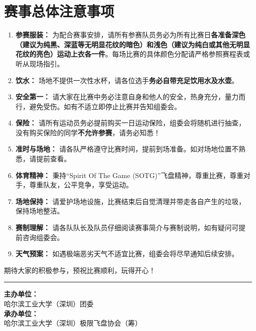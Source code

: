 \documentclass{ctexart}
\begin{document}
\section{赛事总体注意事项}
\begin{enumerate}[label=\arabic*., itemsep=0.5em]
    \item \textbf{参赛服装：} 为配合赛事安排，请所有参赛队员务必为所有比赛日\textbf{各准备深色（建议为纯黑、深蓝等无明显花纹的暗色）和浅色（建议为纯白或其他无明显花纹的亮色）运动上衣各一件}。每场比赛的具体颜色分配请严格参照赛程表或听从现场指引。
    \item \textbf{饮水：} 场地不提供一次性水杯，请各位选手\textbf{务必自带充足饮用水及水壶}。
    \item \textbf{安全第一：} 请大家在比赛中务必注意自身和他人的安全，热身充分，量力而行，避免受伤。如有不适立即停止比赛并告知组委会。
    \item \textbf{保险：} 请所有运动员务必提前购买一日运动保险，组委会将随机进行抽查，没有购买保险的同学\textbf{不允许参赛}，请务必知悉！
    \item \textbf{准时与场地：} 请各队严格遵守比赛时间，提前到场准备。如对场地位置不熟悉，请提前查看。
    \item \textbf{体育精神：} 秉持“Spirit Of The Game (SOTG)”飞盘精神，尊重比赛，尊重对手，尊重队友，公平竞争，享受运动。
    \item \textbf{场地保持：} 请爱护场地设施，比赛结束后自觉清理并带走各自产生的垃圾，保持场地整洁。
    \item \textbf{赛制理解：} 请各队队长及队员仔细阅读赛事简介与赛制说明，如有疑问可提前咨询组委会。
    \item \textbf{天气预案：} 如遇极端恶劣天气不适宜比赛，组委会将尽早通知后续安排。
\end{enumerate}
\vspace{1.5em}

\begin{center}
期待大家的积极参与，预祝比赛顺利，玩得开心！
\end{center}
\vspace{1.5em}

\noindent\rule{\linewidth}{0.4pt}
\vspace{1em}

\begin{flushleft}
\textbf{主办单位：} \\
哈尔滨工业大学（深圳）团委 \\[1em]

\textbf{承办单位：} \\
哈尔滨工业大学（深圳）极限飞盘协会（筹）
\end{flushleft}
\end{document}
